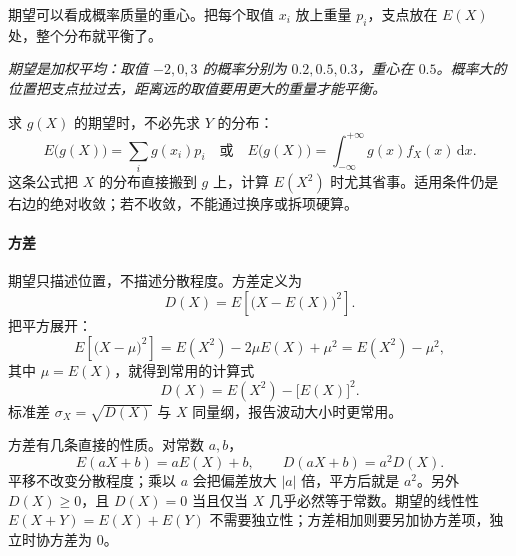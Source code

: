 期望可以看成概率质量的重心。把每个取值 $x_i$ 放上重量 $p_i$，支点放在 $E(X)$ 处，整个分布就平衡了。

\begin{center}
\par\vspace{3pt}
{\footnotesize\itshape 期望是加权平均：取值 $-2,0,3$ 的概率分别为 $0.2,0.5,0.3$，重心在 $0.5$。概率大的位置把支点拉过去，距离远的取值要用更大的重量才能平衡。}
\end{center}

求 $g(X)$ 的期望时，不必先求 $Y$ 的分布：
\[
E\bigl(g(X)\bigr)=\sum_i g(x_i)p_i
\quad\text{或}\quad
E\bigl(g(X)\bigr)=\int_{-\infty}^{+\infty}g(x)f_X(x)\,\mathrm dx .
\]
这条公式把 $X$ 的分布直接搬到 $g$ 上，计算 $E(X^2)$ 时尤其省事。适用条件仍是右边的绝对收敛；若不收敛，不能通过换序或拆项硬算。

\paragraph{方差} 期望只描述位置，不描述分散程度。方差定义为
\[
D(X)=E\left[\bigl(X-E(X)\bigr)^2\right].
\]
把平方展开：
\[
E\left[\bigl(X-\mu\bigr)^2\right]=E(X^2)-2\mu E(X)+\mu^2=E(X^2)-\mu^2,
\]
其中 $\mu=E(X)$，就得到常用的计算式
\[
D(X)=E(X^2)-\bigl[E(X)\bigr]^2 .
\]
标准差 $\sigma_X=\sqrt{D(X)}$ 与 $X$ 同量纲，报告波动大小时更常用。

方差有几条直接的性质。对常数 $a,b$，
\[
E(aX+b)=aE(X)+b,\qquad D(aX+b)=a^2D(X).
\]
平移不改变分散程度；乘以 $a$ 会把偏差放大 $|a|$ 倍，平方后就是 $a^2$。另外 $D(X)\ge0$，且 $D(X)=0$ 当且仅当 $X$ 几乎必然等于常数。期望的线性性 $E(X+Y)=E(X)+E(Y)$ 不需要独立性；方差相加则要另加协方差项，独立时协方差为 $0$。

